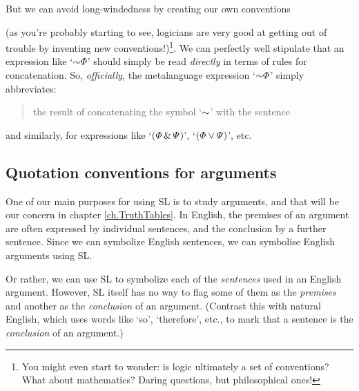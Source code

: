 But we can avoid long-windedness by creating our own conventions {\color{black} (as you're probably starting to see, logicians are very good at getting out of trouble by inventing new conventions!)\footnote{{\color{black} You might even start to wonder: is logic ultimately a set of conventions? What about mathematics? Daring questions, but philosophical ones!}}. We can perfectly well stipulate that an expression like `$\enot \metaA{}$' should simply be read \emph{directly} in terms of rules for concatenation. So, \emph{officially}, the metalanguage expression `$\enot \metaA{}$'
simply abbreviates:
\begin{quote}
	the result of concatenating the symbol `$\enot$' with the sentence \metaA{}
\end{quote}
and similarly, for expressions like `$(\varPhi{} \,\&\, \varPsi{})$', `$(\varPhi{} \vee \varPsi{})$', etc.


\subsection{Quotation conventions for arguments}
One of our main purposes for using SL is to study arguments, and that will be our concern in chapter \ref{ch.TruthTables}. In English, the premises of an argument are often expressed by individual sentences, and the conclusion by a further sentence. Since we can symbolize English sentences, we can symbolise English arguments using SL.

Or rather, we can use SL to symbolize each of the \emph{sentences} used in an English argument. However, SL itself has no way to flag some of them as the \emph{premises} and another as the \emph{conclusion} of an argument.  (Contrast this with natural English, which uses words like `so', `therefore', etc., to mark that a sentence is the \emph{conclusion} of an argument.)



}

